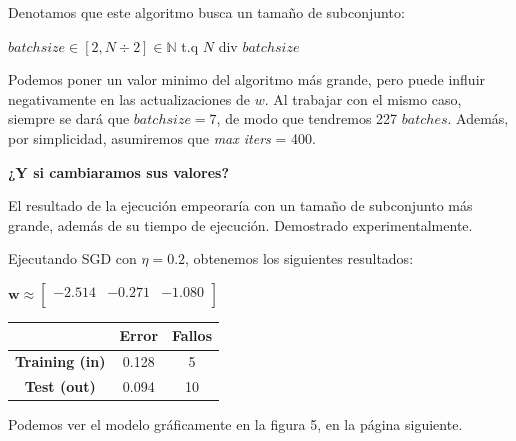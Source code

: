\documentclass{article}
\begin{document}
    \begin{algorithmic}
        \EndWhile
        \Do
            \EndFor
        \EndFunction
    \end{algorithmic}
    Denotamos que este algoritmo busca un tamaño de subconjunto: \linebreak
    \begin{center}
        $batchsize \in [2,N \div2 ] \in \mathbb{N}$
        t.q $N$ div $batchsize$
    \end{center}

    Podemos poner un valor minimo del algoritmo más grande, pero puede influir negativamente en las actualizaciones
    de $w$. Al trabajar con el mismo caso, siempre se dará que $batchsize = 7$, de modo que tendremos 227 $batches$.
    Además, por simplicidad, asumiremos que \textit{max iters} = 400.
    \vspace*{0.1in}
    
    \textbf{¿Y si cambiaramos sus valores?}

    El resultado de la ejecución empeoraría con un tamaño de subconjunto más grande, además de su tiempo de ejecución.
    Demostrado experimentalmente.
    \vspace*{0.1in}


    Ejecutando SGD con $\eta = 0.2$, obtenemos los siguientes resultados:
    \begin{center}
        $\textbf{w} \approx \begin{bmatrix}
            -2.514 & -0.271 & -1.080 \\
        \end{bmatrix}$
        \qquad
        \begin{tabular}{ |c|c|c| }
            \hline
            & \textbf{Error} & \textbf{Fallos} \\
            \hline
            \textbf{Training (in)} & 0.128 & 5 \\
            \hline
            \textbf{Test (out)} & 0.094 & 10 \\
            \hline
        \end{tabular}
    \end{center}
    Podemos ver el modelo gráficamente en la figura 5, en la página siguiente.
\end{document}
